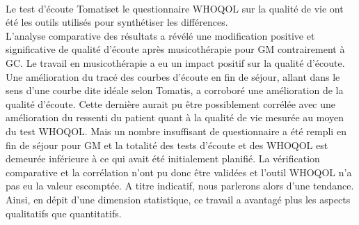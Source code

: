  Le test d'écoute Tomatis\textsuperscript \textregistered  et le questionnaire WHOQOL sur la qualité de 
 vie 
 ont été les outils 
 utilisés 
 pour synthétiser les différences. 
 \\
  L'analyse comparative des résultats a révélé une modification positive et significative 
 de qualité d'écoute après musicothérapie 
 pour GM contrairement à GC. 
 Le travail en musicothérapie a
 eu un impact positif sur la qualité d'écoute.
Une amélioration du tracé des courbes d'écoute en 
fin de séjour, allant dans le sens d'une courbe dite idéale selon Tomatis, a corroboré une 
amélioration de la qualité d'écoute. Cette dernière aurait pu être possiblement corrélée avec une 
amélioration du ressenti du patient quant à 
la qualité de vie mesurée au moyen du test WHOQOL.
  Mais  un nombre insuffisant de questionnaire a été rempli en 
  fin de séjour pour GM et la totalité des tests d'écoute et des WHOQOL est  demeurée 
inférieure à ce qui avait été initialement planifié. La vérification comparative et la corrélation n'ont pu donc 
être validées et l'outil 
WHOQOL n'a pas eu 
la valeur escomptée. A titre indicatif, nous parlerons alors d'une tendance. Ainsi, en  dépit d'une  
dimension statistique, ce 
travail a avantagé plus les aspects qualitatifs que quantitatifs.


 
